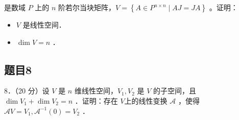 \documentclass{article}
\begin{document}
是数域 \(P\) 上的 \(n\) 阶若尔当块矩阵，\(V=\left\{A \in P^{n \times n} \mid A J=J A\right\}\) 。证明：

\begin{itemize}
  \item[（1）] \(V\) 是线性空间．
  \item[（2）] \(\operatorname{dim} V=n\) ．
\end{itemize}

\subsection{题目8}
8．（20 分）设 \(V\) 是 \(n\) 维线性空间，\(V_{1}, V_{2}\) 是 \(V\) 的子空间，且 \(\operatorname{dim} V_{1}+\operatorname{dim} V_{2}=n\) ．证明：存在 \(V\)上的线性变换 \(\mathcal{A}\) ，使得 \(\mathcal{A} V=V_{1}, \mathcal{A}^{-1}(0)=V_{2}\) ．
\end{document}

